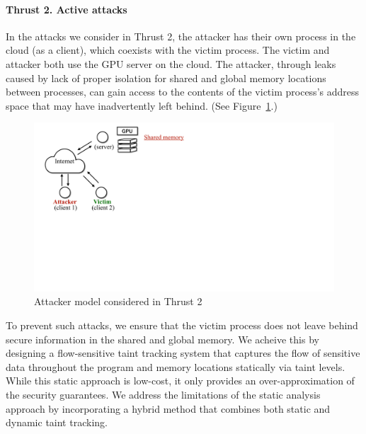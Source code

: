 \paragraph{Thrust 2. Active attacks}
In the attacks we consider in Thrust 2, the attacker has their own process in the cloud (as a client), which coexists with the victim process.
%
The victim and attacker both use the GPU server on the cloud.
%
The attacker, through leaks caused by lack of proper isolation for shared and  global memory locations between processes, can gain access to the contents of the victim process's address space that may have inadvertently left behind.
%
(See Figure~\ref{fig:th2-attack}.)
\begin{figure}[h]
    \centering
    \includegraphics[clip,trim=0 17cm 10cm 0cm,width=0.72\pdfpagewidth]{figs/thrust2-fig.pdf}
    \caption{Attacker model considered in Thrust 2 }
    \label{fig:th2-attack}
\end{figure}

To prevent such attacks, we ensure that the victim process does not leave behind secure information in the shared and global memory. We acheive this by designing a flow-sensitive taint tracking system that captures the flow of sensitive data throughout the program and memory locations statically via taint levels.
%
While this static approach is low-cost, it only provides an over-approximation of the security guarantees. 
We address the limitations of the static analysis approach by incorporating a hybrid method that combines both static and dynamic taint tracking.

